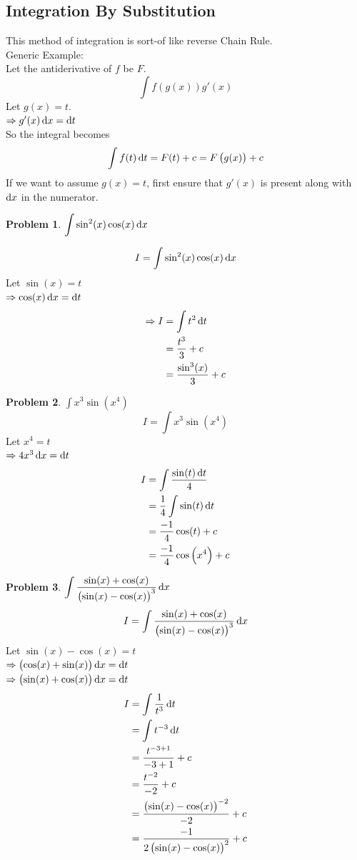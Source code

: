 \documentclass[14]{article}
\theoremstyle{definition}
\newtheorem{prob}{Problem}
\theoremstyle{case}
\begin{document}
\subsection{Integration By Substitution}
This method of integration is sort-of like reverse Chain Rule.\\
Generic Example:\\
Let the antiderivative of $f$ be $F$.
\[\int f\left(g(x)\right) g'(x)\]
Let $g(x) = t$.\\
$\Rightarrow g'(x) \dif x = \dif t$\\
So the integral becomes
\[\int f(t) \dif t = F(t) + c = F\left(g(x)\right) + c\]
If we want to assume $g(x) = t$, first ensure that $g'(x)$ is present along with $\dif x$ in the numerator.
\begin{prob}
$\displaystyle\int \sin^2(x) \cos(x) \dif x$
\end{prob}
\[I = \int \sin^2(x) \cos(x) \dif x\]
Let $\sin(x) = t$\\
$\Rightarrow \cos(x) \dif x = \dif t$
\begin{align*}
\Rightarrow I &= \int t^2 \dif t\\
&= \dfrac{t^3}{3} + c\\
&= \dfrac{\sin^3(x)}{3} + c
\end{align*}
\begin{prob}
$\displaystyle\int x^3 \sin\left( x^4 \right)$
\[I = \int x^3 \sin\left( x^4 \right)\]
Let $x^4 = t$\\
$\Rightarrow 4x^3 \dif x = \dif t$
\begin{align*}
I &= \int \dfrac{\sin(t) \dif t}{4}\\
&= \dfrac14 \int \sin(t) \dif t\\
&= \dfrac{-1}4 \cos(t) + c\\
&= \dfrac{-1}{4}\cos\left(x^4\right)+c
\end{align*}
\end{prob}
\pagebreak
\begin{prob}
$\displaystyle\int \dfrac{\sin(x) + \cos(x)}{\left(\sin(x)-\cos(x)\right)^3}\dif x$
\[I = \int \dfrac{\sin(x) + \cos(x)}{\left(\sin(x)-\cos(x)\right)^3}\dif x\]
Let $\sin(x) - \cos(x) = t$\\
$\Rightarrow \left(\cos(x) + \sin(x)\right) \dif x = \dif t$\\
$\Rightarrow \left(\sin(x)+\cos(x)\right) \dif x = \dif t$
\begin{align*}
I &= \int \dfrac{1}{t^3}\dif t\\
&= \int t^{-3} \dif t\\
&= \dfrac{t^{-3+1}}{-3+1} + c\\
&= \dfrac{t^{-2}}{-2} + c\\
&= \dfrac{\left( \sin(x) - \cos(x) \right)^{-2}}{-2} + c\\
&= \dfrac{-1}{2\left( \sin(x) - \cos(x) \right)^2}+c
\end{align*}
\end{prob}
\end{document}
